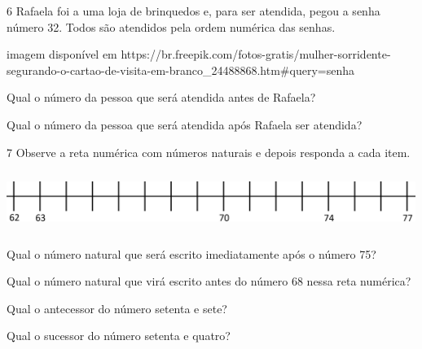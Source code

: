 \begin{escolha}
\num{6} Rafaela foi a uma loja de brinquedos e, para ser atendida, pegou a senha
número 32. Todos são atendidos pela ordem numérica das senhas.

\incluir imagem disponível em https://br.freepik.com/fotos-gratis/mulher-sorridente-segurando-o-cartao-de-visita-em-branco_24488868.htm#query=senha%

\begin{escolha}

\item
  Qual o número da pessoa que será atendida antes de Rafaela?

\item
  Qual o número da pessoa que será atendida após Rafaela ser atendida?

\end{escolha}

\num{7} Observe a reta numérica com números naturais e depois responda a cada item.


\includegraphics[width=5.22545in,height=0.75840in]{media/image31.png}

\begin{escolha}

\item
  Qual o número natural que será escrito imediatamente após o número 75?

\item
  Qual o número natural que virá escrito antes do número 68 nessa reta
  numérica?

\item
  Qual o antecessor do número setenta e sete?

\item
  Qual o sucessor do número setenta e quatro?

\end{escolha}


\end{escolha}
